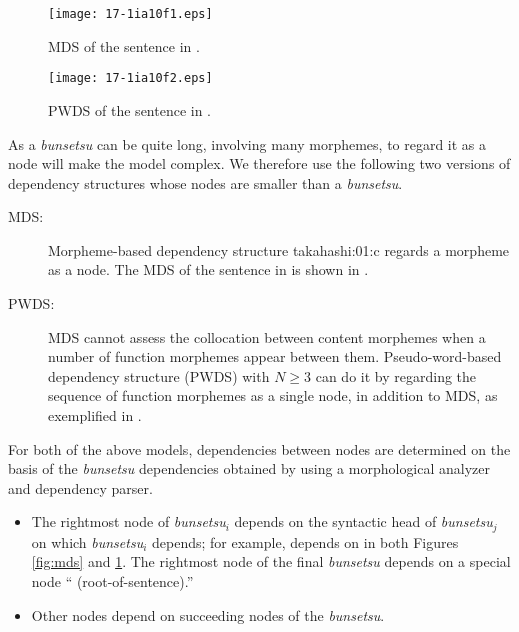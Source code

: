 \documentclass[english]{jnlp_1.4}
\renewcommand{\cite}{}
\begin{document}
\begin{figure}[t]
\begin{minipage}[t]{192pt}
\begin{center}
\texttt{[image: 17-1ia10f1.eps]}
\end{center}
\caption{MDS of the sentence in .}
\label{fig:mds}
\end{minipage}
\hfill
\begin{minipage}[t]{212pt}
\begin{center}
\texttt{[image: 17-1ia10f2.eps]}
\end{center}
\caption{PWDS of the sentence in .}
\label{fig:pwds}
\end{minipage}
\end{figure}

As a \textit{bunsetsu} can be quite long, involving many morphemes, to
regard it as a node will make the model complex.  We therefore use the
following two versions of dependency structures whose nodes are
smaller than a \textit{bunsetsu}.
\begin{description}
\item[MDS:] Morpheme-based dependency structure \cite{takahashi:01:c}
  regards a morpheme as a node. The MDS of the sentence in
   is shown in .
\item[PWDS:] MDS cannot assess the collocation between content
  morphemes when a number of function morphemes appear between them.
  Pseudo-word-based dependency structure (PWDS) with $N\ge\text{3}$ can
  do it by regarding the sequence of function morphemes as a single
  node, in addition to MDS, as exemplified in .
\end{description}
For both of the above models, dependencies between nodes are
determined on the basis of the \textit{bunsetsu} dependencies obtained
by using a morphological analyzer and dependency parser.
\begin{itemize}
\item The rightmost node of \textit{bunsetsu}$_{i}$ depends on the
  syntactic head of \textit{bunsetsu}$_{j}$ on which
  \textit{bunsetsu}$_{i}$ depends; for example, 
  depends on  in both Figures \ref{fig:mds} and
  \ref{fig:pwds}.  The rightmost node of the final \textit{bunsetsu}
  depends on a special node `` (root-of-sentence).''
\item Other nodes depend on succeeding nodes of the \textit{bunsetsu}.
\end{itemize}
\end{document}
